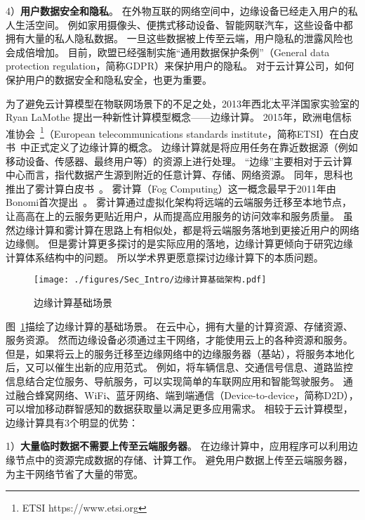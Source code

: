 4）\textbf{用户数据安全和隐私}。
在外物互联的网络空间中，边缘设备已经走入用户的私人生活空间。
例如家用摄像头、便携式移动设备、智能网联汽车，这些设备中都拥有大量的私人隐私数据。
一旦这些数据被上传至云端，用户隐私的泄露风险也会成倍增加。
目前，欧盟已经强制实施“通用数据保护条例”（General data protection regulation，简称GDPR）来保护用户的隐私。
对于云计算公司，如何保护用户的数据安全和隐私安全，也更为重要。

为了避免云计算模型在物联网场景下的不足之处，2013年西北太平洋国家实验室的 Ryan LaMothe 提出一种新性计算模型概念——边缘计算。
2015年，欧洲电信标准协会~\footnote{ETSI https://www.etsi.org}（European telecommunications standards institute，简称ETSI）在白皮书~\cite{hu2015mobile}中正式定义了边缘计算的概念。
边缘计算就是将应用任务在靠近数据源（例如移动设备、传感器、最终用户等）的资源上进行处理。
“边缘”主要相对于云计算中心而言，指代数据产生源到附近的任意计算、存储、网络资源。
同年，思科也推出了雾计算白皮书~\cite{computing2015internet}。
雾计算（Fog Computing）这一概念最早于2011年由Bonomi首次提出~\cite{bonomi2011connected}。
雾计算通过虚拟化架构将远端的云端服务迁移至本地节点，让高高在上的云服务更贴近用户，从而提高应用服务的访问效率和服务质量。
虽然边缘计算和雾计算在思路上有相似处，都是将云端服务落地到更接近用户的网络边缘侧。
但是雾计算更多探讨的是实际应用的落地，边缘计算更倾向于研究边缘计算体系结构中的问题。
所以学术界更愿意探讨边缘计算下的本质问题。

\begin{figure}[!h]
  \centering
  \texttt{[image: ./figures/Sec\_Intro/边缘计算基础架构.pdf]}
  \vspace{-0.5em}
  \caption{边缘计算基础场景}
  \vspace{-2em}
  \label{Figure_EC_Architecture}
\end{figure}

图~\ref{Figure_EC_Architecture}描绘了边缘计算的基础场景。
在云中心，拥有大量的计算资源、存储资源、服务资源。
然而边缘设备必须通过主干网络，才能使用云上的各种资源和服务。
但是，如果将云上的服务迁移至边缘网络中的边缘服务器（基站），将服务本地化后，又可以催生出新的应用范式。
例如，将车辆信息、交通信号信息、道路监控信息结合定位服务、导航服务，可以实现简单的车联网应用和智能驾驶服务。
通过融合蜂窝网络、WiFi、蓝牙网络、端到端通信（Device-to-device，简称D2D），可以增加移动群智感知的数据获取量以满足更多应用需求。
相较于云计算模型，边缘计算具有3个明显的优势：

1）\textbf{大量临时数据不需要上传至云端服务器}。
在边缘计算中，应用程序可以利用边缘节点中的资源完成数据的存储、计算工作。
避免用户数据上传至云端服务器，为主干网络节省了大量的带宽。

